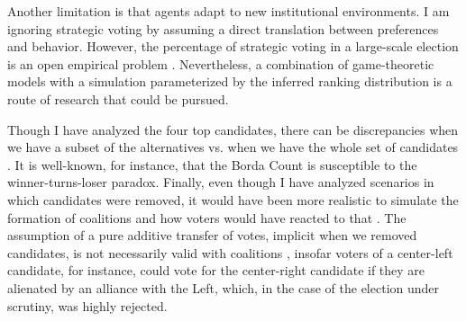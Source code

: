 \documentclass[hidelinks,11pt]{article} \usepackage[utf8]{inputenc}
\begin{document}
Another limitation is that agents adapt to new institutional environments. I am
ignoring strategic voting by assuming a direct translation between preferences
and behavior. However, the percentage of strategic voting in a large-scale
election is an open empirical problem
\parencite{straeten10_strat_sincer_heuris_votin_under,kawai2013inferring}.
Nevertheless, a combination of game-theoretic models with a simulation
parameterized by the inferred ranking distribution is a route of research that
could be pursued.

Though I have analyzed the four top candidates, there can be discrepancies when
we have a subset of the alternatives vs. when we have the whole set of
candidates \parencite{saari2001chaotic, kaminski2015empirical}. It is
well-known, for instance, that the Borda Count is susceptible to the
winner-turns-loser paradox. Finally, even though I have analyzed scenarios in
which candidates were removed, it would have been more realistic to simulate the
formation of coalitions and how voters would have reacted to that
\parencite{kaminski1998revival}. The assumption of a pure additive transfer of
votes, implicit when we removed candidates, is not necessarily valid with
coalitions \parencite{kaminski2001coalitional}, insofar voters of a center-left
candidate, for instance, could vote for the center-right candidate if they are
alienated by an alliance with the Left, which, in the case of the election under
scrutiny, was highly rejected. \printbibliography
\end{document}
